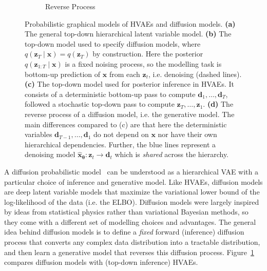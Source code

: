 \begin{figure}[!t]
\begin{subfigure}{.26\columnwidth}
        \caption{Reverse Process}
    \end{subfigure}
    \hfill
    \caption{Probabilistic graphical models of HVAEs and diffusion models. \textbf{(a)} The general top-down hierarchical latent variable model. \textbf{(b)} The top-down model used to specify diffusion models, where $q(\mathbf{z}_T \mid \mathbf{x}) = q(\mathbf{z}_T)$ by construction. Here the posterior $q(\mathbf{z}_{1:T} \mid \mathbf{x})$ is a fixed noising process, so the modelling task is bottom-up prediction of $\mathbf{x}$ from each $\mathbf{z}_t$, i.e. denoising (dashed lines). \textbf{(c)} The top-down model used for posterior inference in HVAEs. It consists of a deterministic bottom-up pass to compute $\mathbf{d}_1,\dots,\mathbf{d}_T$, followed a stochastic top-down pass to compute $\mathbf{z}_T,\dots,\mathbf{z}_1$. \textbf{(d)} The reverse process of a diffusion model, i.e. the generative model. The main differences compared to (c) are that here the deterministic variables $\mathbf{d}_{T-1},\dots,\mathbf{d}_1$ do not depend on $\mathbf{x}$ nor have their own hierarchical dependencies. Further, the {\color{blue}blue} lines represent a denoising model $\hat{\mathbf{x}}_{\boldsymbol{\theta}} :\mathbf{z}_t \to \mathbf{d}_t$ which is \textit{shared} across the hierarchy.
    }
    \label{fig: hvae2}
\end{figure}
%
A diffusion probabilistic model~\citep{sohl2015deep} can be understood as a hierarchical VAE with a particular choice of inference and generative model. Like HVAEs, diffusion models are deep latent variable models that maximize the variational lower bound of the log-likelihood of the data (i.e. the ELBO). Diffusion models were largely inspired by ideas from statistical physics rather than variational Bayesian methods, so they come with a different set of modelling choices and advantages. The general idea behind diffusion models is to define a \textit{fixed} forward (inference) diffusion process that converts any complex data distribution into a tractable distribution, and then learn a generative model that reverses this diffusion process. Figure~\ref{fig: hvae2} compares diffusion models with (top-down inference) HVAEs.

